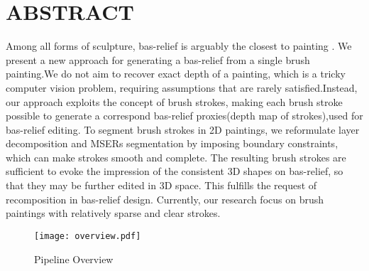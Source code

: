 \section*{\centering ABSTRACT}

Among all forms of sculpture, bas-relief is arguably the closest to painting .  We present a new approach for generating a bas-relief from a single brush painting.We do not aim to recover exact depth of a painting, which is a tricky computer vision problem, requiring assumptions that are rarely satisfied.Instead, our approach exploits the concept of brush strokes, making each brush stroke possible to generate a correspond bas-relief proxies(depth map of strokes),used for bas-relief editing. To segment brush strokes in 2D paintings, we reformulate layer decomposition and MSERs segmentation by imposing boundary constraints, which can make strokes smooth and complete. The resulting brush strokes are sufficient to evoke the impression of the consistent 3D shapes on bas-relief, so that they may be further edited in 3D space. This fulfills the request of recomposition in bas-relief design. Currently, our research focus on brush paintings with relatively sparse and clear strokes. 


\begin{figure}[H]
\centering
\texttt{[image: overview.pdf]}
\caption{Pipeline Overview}
\label{pip}
\end{figure} 
 
\newpage


 

